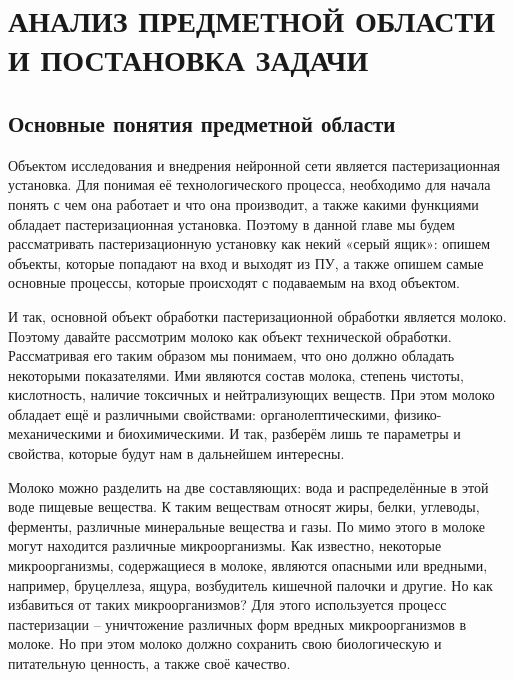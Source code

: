 \sectionbreak \section{
  \cyrillicfont 
  \fontsize{14pt}{24pt}\selectfont 
  \englishfont 
  \redline
  АНАЛИЗ ПРЕДМЕТНОЙ ОБЛАСТИ И ПОСТАНОВКА ЗАДАЧИ
}

\titlespace
\subsection{ 
  \cyrillicfont 
  \fontsize{14pt}{24pt}\selectfont
  \englishfont
  \redline
  Основные понятия предметной области
} 
\titlespace

{\cyrillicfont 
\fontsize{13pt}{16.25pt}\selectfont 
\englishfont 

  \par \redline Объектом исследования и внедрения нейронной сети является пастеризационная установка. Для понимая её технологического процесса, необходимо для начала понять с чем она работает и что она производит, а также какими функциями обладает пастеризационная установка. Поэтому в данной главе мы будем рассматривать пастеризационную установку как некий «серый ящик»: опишем объекты, которые попадают на вход и выходят из ПУ, а также опишем самые основные процессы, которые происходят с подаваемым на вход объектом. 

  \par \redline И так, основной объект обработки пастеризационной обработки является молоко. Поэтому давайте рассмотрим молоко как объект технической обработки. Рассматривая его таким образом мы понимаем, что оно должно обладать некоторыми показателями. Ими являются состав молока, степень чистоты, кислотность, наличие токсичных и нейтрализующих веществ. При этом молоко обладает ещё и различными свойствами: органолептическими, физико-механическими и биохимическими. И так, разберём лишь те параметры и свойства, которые будут нам в дальнейшем интересны.

  \par \redline Молоко можно разделить на две составляющих: вода и распределённые в этой воде пищевые вещества. К таким веществам относят жиры, белки, углеводы, ферменты, различные минеральные вещества и газы. По мимо этого в молоке могут находится различные микроорганизмы. Как известно, некоторые микроорганизмы, содержащиеся в молоке, являются опасными или вредными, например, бруцеллеза, ящура, возбудитель кишечной палочки и другие. Но как избавиться от таких микроорганизмов?  Для этого используется процесс пастеризации {--} уничтожение различных форм вредных микроорганизмов в молоке. Но при этом молоко должно сохранить свою биологическую и питательную ценность, а также своё качество. 

}
